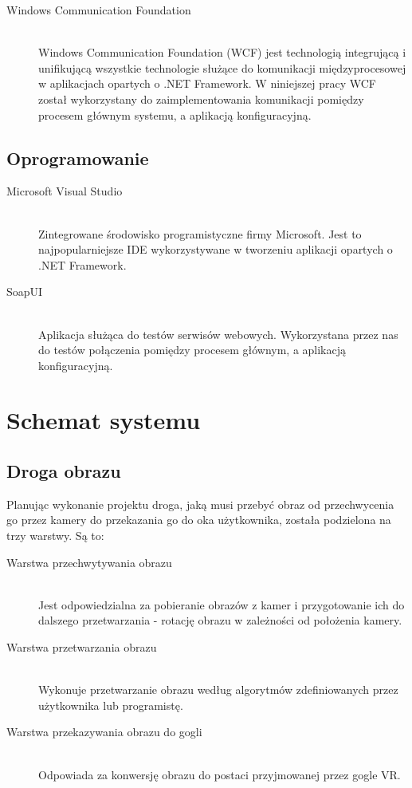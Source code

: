 \documentclass[a4paper,11pt,twoside]{report}
\theoremstyle{definition}
\begin{document}
\begin{description}
\item [Windows Communication Foundation] \hfill \\
Windows Communication Foundation (WCF) jest technologią integrującą i unifikującą wszystkie technologie służące do komunikacji międzyprocesowej w aplikacjach opartych o .NET Framework. W niniejszej pracy WCF został wykorzystany do zaimplementowania komunikacji pomiędzy procesem głównym systemu, a aplikacją konfiguracyjną.
\end{description}

\subsection{Oprogramowanie}

\begin{description}
\item [Microsoft Visual Studio] \hfill \\
Zintegrowane środowisko programistyczne firmy Microsoft. Jest to najpopularniejsze IDE wykorzystywane w tworzeniu aplikacji opartych o .NET Framework.
\item [SoapUI] \hfill \\
Aplikacja służąca do testów serwisów webowych. Wykorzystana przez nas do testów połączenia pomiędzy procesem głównym, a aplikacją konfiguracyjną.
\end{description}

\section{Schemat systemu}

\subsection{Droga obrazu}

Planując wykonanie projektu droga, jaką musi przebyć obraz od przechwycenia go przez kamery do przekazania go do oka użytkownika, została podzielona na trzy warstwy. Są to:

\begin{description}
\item [Warstwa przechwytywania obrazu] \hfill \\ Jest odpowiedzialna za pobieranie obrazów z kamer i przygotowanie ich do dalszego przetwarzania - rotację obrazu w zależności od położenia kamery.
\item [Warstwa przetwarzania obrazu] \hfill \\ Wykonuje przetwarzanie obrazu według algorytmów zdefiniowanych przez użytkownika lub programistę.
\item [Warstwa przekazywania obrazu do gogli] \hfill \\ Odpowiada za konwersję obrazu do postaci przyjmowanej przez gogle VR.
\end{description}
\end{document}

